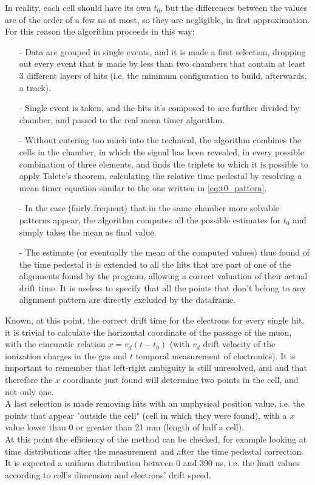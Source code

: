 \documentclass[a4paper,11pt]{book}
\begin{document}
In reality, each cell should have its own $t_0$, but the differences between the values are of the order of a few ns at most, so they are negligible, in first approximation. For this reason the algorithm proceeds in this way:
\begin{itemize}
\item[-] Data are grouped in single events, and it is made a first selection, dropping out every event that is made by less than two chambers that contain at least 3 different layers of hits (i.e. the minimum configuration to build, afterwards, a track).
\item[-] Single event is taken, and the hits it's composed to are further divided by chamber, and passed to the real mean timer algorithm.
\item[-] Without entering too much into the technical, the algorithm combines the cells in the chamber, in which the signal has been revealed, in every possible combination of three elements, and finds the triplets to which it is possible to apply Talete's theorem, calculating the relative time pedestal by resolving a mean timer equation similar to the one written in \ref{eq:t0_pattern}.
\item[-] In the case (fairly frequent) that in the same chamber more solvable patterns appear, the algorithm computes all the possible estimates for $t_0$ and simply takes the mean as final value.
\item[-] The estimate (or eventually the mean of the computed values) thus found of the time pedestal it is extended to all the hits that are part of one of the alignments found by the program, allowing a correct valuation of their actual drift time. It is useless to specify that all the points that don't belong to any alignment pattern are directly excluded by the dataframe.
\end{itemize}

Known, at this point, the correct drift time for the electrons for every single hit, it is trivial to calculate the horizontal coordinate of the passage of the muon, with the cinematic relation $x = v_d(t - t_0)$ (with $v_d$ drift velocity of the ionization charges in the gas and $t$ temporal measurement of electronics). It is important to remember that left-right ambiguity is still unresolved, and and that therefore the $x$ coordinate just found will determine two points in the cell, and not only one.\\
A last selection is made removing hits with an unphysical position value, i.e. the points that appear "outside the cell" (cell in which they were found), with a $x$ value lower than 0 or greater than 21 mm (length of half a cell).\\
At this point the efficiency of the method can be checked, for example looking at time distributions after the measurement and after the time pedestal correction. It is expected a uniform distribution between 0 and 390 ns, i.e. the limit values according to cell's dimension and electrons' drift speed.\\ 
\end{document}

